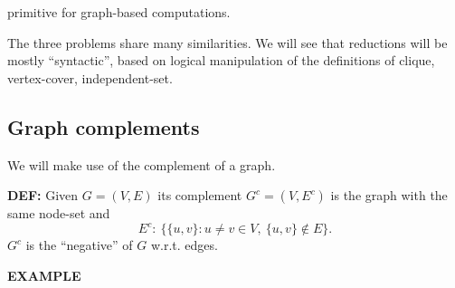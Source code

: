 primitive for graph-based computations.

The three problems share many similarities. We will see that reductions will be mostly ``syntactic'', based on logical manipulation of the definitions of clique, vertex-cover, independent-set.

\subsection{Graph complements}
We will make use of the complement of a graph.

\begin{notesdefinition}
\textbf{DEF:} Given $G=(V,E)$ its complement $G^c=(V,E^c)$ is the graph with the same node-set and
\[E^c:\ \{\{u,v\}:u\neq v\in V,\ \{u,v\}\notin E\}.\]
$G^c$ is the ``negative'' of $G$ w.r.t. edges.
\end{notesdefinition}

\textbf{EXAMPLE}

